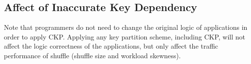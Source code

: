 \documentclass[10pt,journal,compsoc]{IEEEtran}
\begin{document}







\subsection{Affect of Inaccurate Key Dependency}\label{section:inaccurate}
Note that programmers do not need to change the original logic of applications in order to apply CKP. 
Applying any key partition scheme, including CKP, will not affect
the logic correctness of the applications, but only affect the traffic 
performance of shuffle (shuffle size and workload skewness). 
\end{document}
